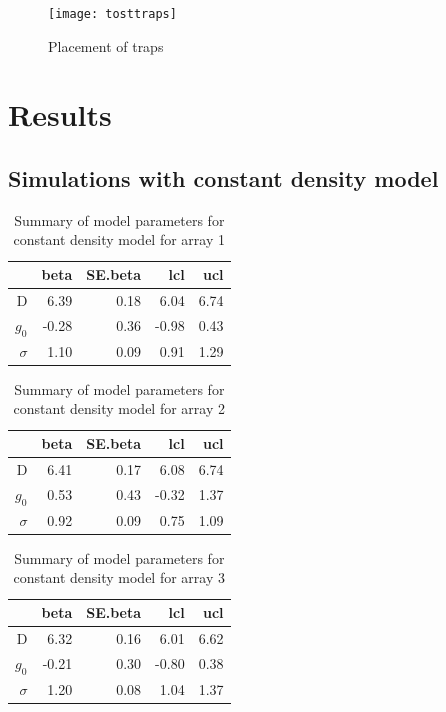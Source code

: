 \documentclass[a4paper,12pt]{article}
\begin{document}
\begin{figure}[H]
\centering
\texttt{[image: tosttraps]}
\caption{Placement of traps}
\label{tosttraps}
\end{figure}

\section{Results}
\subsection{Simulations with constant density model}

\begin{table}[H]
\centering
\begin{tabular}{rrrrr}
  \hline
 & beta & SE.beta & lcl & ucl \\ 
  \hline
D & 6.39 & 0.18 & 6.04 & 6.74 \\ 
  $g_0$ & -0.28 & 0.36 & -0.98 & 0.43 \\ 
  $\sigma$ & 1.10 & 0.09 & 0.91 & 1.29 \\ 
   \hline
\end{tabular}
\caption{Summary of model parameters for constant density model for array 1}
\end{table}

\begin{table}[H]
\centering
\begin{tabular}{rrrrr}
  \hline
 & beta & SE.beta & lcl & ucl \\ 
  \hline
D & 6.41 & 0.17 & 6.08 & 6.74 \\ 
  $g_0$ & 0.53 & 0.43 & -0.32 & 1.37 \\ 
  $\sigma$ & 0.92 & 0.09 & 0.75 & 1.09 \\ 
   \hline
\end{tabular}
\caption{Summary of model parameters for constant density model for array 2}
\end{table}

\begin{table}[H]
\centering
\begin{tabular}{rrrrr}
  \hline
 & beta & SE.beta & lcl & ucl \\ 
  \hline
D & 6.32 & 0.16 & 6.01 & 6.62 \\ 
  $g_0$ & -0.21 & 0.30 & -0.80 & 0.38 \\ 
  $\sigma$ & 1.20 & 0.08 & 1.04 & 1.37 \\ 
   \hline
\end{tabular}
\caption{Summary of model parameters for constant density model for array 3}
\end{table}
\end{document}
